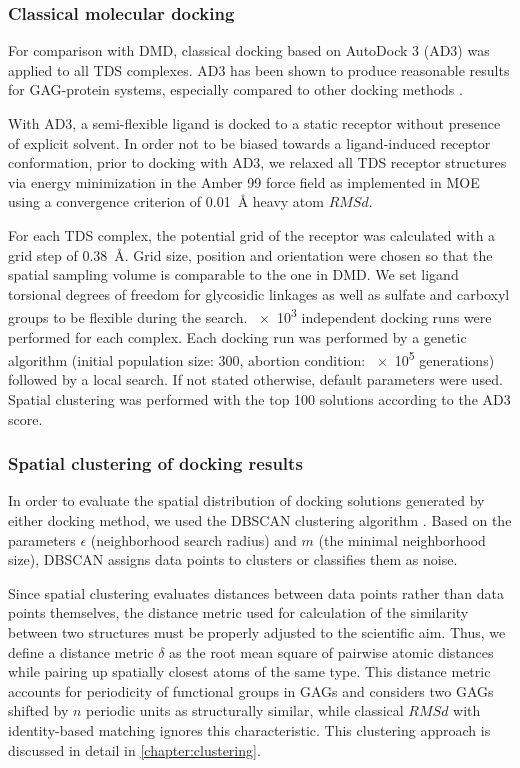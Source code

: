 \subsubsection{Classical molecular docking}

For comparison with DMD, classical docking based on AutoDock
3 \cite{Morris1998} (AD3) was applied to all TDS complexes. AD3 has
been shown to produce reasonable results for GAG-protein systems, especially
compared to other docking methods \cite{japan_docking_ad3_clustering,
samsonov_docking_2011,pichert_characterization_2012,
imberty_perez_protgag_comp_book_2006,franz_cathepsin_2013}.

With AD3, a semi-flexible ligand is docked to a static receptor without presence
of explicit solvent. In order not to be biased towards a ligand-induced receptor
conformation, prior to docking with AD3, we relaxed all TDS receptor structures
via energy minimization in the Amber 99 force field as implemented in MOE
\cite{chemical_computing_group_inc_moe_2010} using a convergence criterion of
\SI{0.01}{\angstrom} heavy atom $RMSd$.

For each TDS complex, the potential grid of the receptor was calculated with a
grid step of \SI{0.38}{\angstrom}. Grid size, position and orientation were
chosen so that the spatial sampling volume is comparable to the one in DMD. We
set ligand torsional degrees of freedom for glycosidic linkages as well as
sulfate and carboxyl groups to be flexible during the search. \num{e3}
independent docking runs were performed for each complex. Each docking run was
performed by a genetic algorithm (initial population size: 300, abortion
condition: \num{e5} generations) followed by a local search. If not stated
otherwise, default parameters were used. Spatial clustering was performed with
the top 100 solutions according to the AD3 score.

\subsubsection{Spatial clustering of docking results}

In order to evaluate the spatial distribution of docking solutions generated by
either docking method, we used the DBSCAN clustering algorithm
\cite{dbscan_ester1996}. Based on the  parameters $\epsilon$ (neighborhood
search radius) and $m$ (the minimal neighborhood size), DBSCAN assigns data
points to clusters or classifies them as noise.

Since spatial clustering evaluates distances between data points rather than
data points themselves, the distance metric used for calculation of the
similarity between two structures must be properly adjusted to the scientific
aim. Thus, we define a distance metric $\delta$ as the root mean square of
pairwise atomic distances while pairing up spatially closest atoms of the same
type. This distance metric accounts for periodicity of functional groups in GAGs
and considers two GAGs shifted by $n$ periodic units as structurally similar,
while classical $RMSd$ with identity-based matching ignores this characteristic.
This clustering approach is discussed in detail in \cref{chapter:clustering}.

